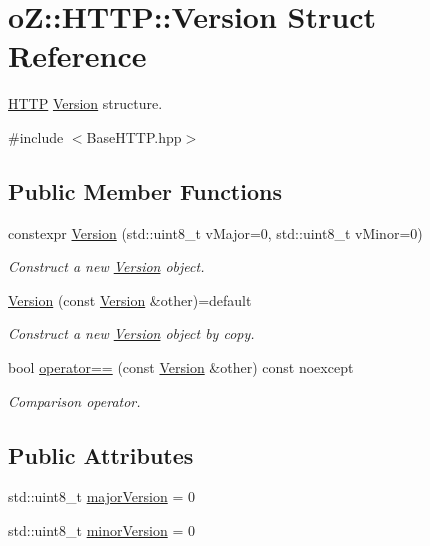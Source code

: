 \hypertarget{structo_z_1_1_h_t_t_p_1_1_version}{}\section{oZ\+::H\+T\+TP\+::Version Struct Reference}
\label{structo_z_1_1_h_t_t_p_1_1_version}


\mbox{\hyperlink{namespaceo_z_1_1_h_t_t_p}{H\+T\+TP}} \mbox{\hyperlink{structo_z_1_1_h_t_t_p_1_1_version}{Version}} structure.  




{\ttfamily \#include $<$Base\+H\+T\+T\+P.\+hpp$>$}

\subsection*{Public Member Functions}
\begin{DoxyCompactItemize}
\item 
constexpr \mbox{\hyperlink{structo_z_1_1_h_t_t_p_1_1_version_a3531840398b7bd19cf9196792f81f23d}{Version}} (std\+::uint8\+\_\+t v\+Major=0, std\+::uint8\+\_\+t v\+Minor=0)
\begin{DoxyCompactList}\small\item\em Construct a new \mbox{\hyperlink{structo_z_1_1_h_t_t_p_1_1_version}{Version}} object. \end{DoxyCompactList}\item 
\mbox{\hyperlink{structo_z_1_1_h_t_t_p_1_1_version_a88ccde399b6f5311dac079843da8dae1}{Version}} (const \mbox{\hyperlink{structo_z_1_1_h_t_t_p_1_1_version}{Version}} \&other)=default
\begin{DoxyCompactList}\small\item\em Construct a new \mbox{\hyperlink{structo_z_1_1_h_t_t_p_1_1_version}{Version}} object by copy. \end{DoxyCompactList}\item 
bool \mbox{\hyperlink{structo_z_1_1_h_t_t_p_1_1_version_a6d985577db3b920c4efa2a03c46b827b}{operator==}} (const \mbox{\hyperlink{structo_z_1_1_h_t_t_p_1_1_version}{Version}} \&other) const noexcept
\begin{DoxyCompactList}\small\item\em Comparison operator. \end{DoxyCompactList}\end{DoxyCompactItemize}
\subsection*{Public Attributes}
\begin{DoxyCompactItemize}
\item 
std\+::uint8\+\_\+t \mbox{\hyperlink{structo_z_1_1_h_t_t_p_1_1_version_a451d759d7fcdcef197c21140b1e9527e}{major\+Version}} = 0
\item 
std\+::uint8\+\_\+t \mbox{\hyperlink{structo_z_1_1_h_t_t_p_1_1_version_a13e3758802c2b9b974f56d1ea25fafad}{minor\+Version}} = 0
\end{DoxyCompactItemize}


